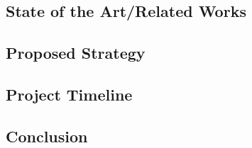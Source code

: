 \documentclass[../main.tex]{subfiles}
\begin{document}
\subsection{State of the Art/Related Works}

\subsection{Proposed Strategy}

\subsection{Project Timeline}

\subsection{Conclusion}
\end{document}
